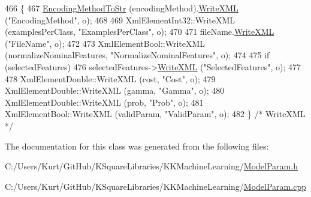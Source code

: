 \begin{DoxyCode}
466 \{
467   \hyperlink{class_k_k_m_l_l_1_1_model_param_a9a8e3761bbc46b241b32c1f19c5f4ee3}{EncodingMethodToStr} (encodingMethod).\hyperlink{class_k_k_b_1_1_k_k_str_a7de8ac49f70cdcdf2cc31786d23b8a62}{WriteXML} (\textcolor{stringliteral}{"EncodingMethod"}, o);
468 
469   XmlElementInt32::WriteXML (examplesPerClass, \textcolor{stringliteral}{"ExamplesPerClass"}, o);
470 
471   fileName.\hyperlink{class_k_k_b_1_1_k_k_str_a7de8ac49f70cdcdf2cc31786d23b8a62}{WriteXML} (\textcolor{stringliteral}{"FileName"}, o);
472 
473   XmlElementBool::WriteXML (normalizeNominalFeatures, \textcolor{stringliteral}{"NormalizeNominalFeatures"}, o);
474 
475   \textcolor{keywordflow}{if}  (selectedFeatures)
476     selectedFeatures->\hyperlink{class_k_k_m_l_l_1_1_feature_num_list_a8119e4ff5c20ad2793df8766c9cb84ea}{WriteXML} (\textcolor{stringliteral}{"SelectedFeatures"}, o);
477 
478   XmlElementDouble::WriteXML (cost,       \textcolor{stringliteral}{"Cost"},       o);
479   XmlElementDouble::WriteXML (gamma,      \textcolor{stringliteral}{"Gamma"},      o);
480   XmlElementDouble::WriteXML (prob,       \textcolor{stringliteral}{"Prob"},       o);
481   XmlElementBool::WriteXML   (validParam, \textcolor{stringliteral}{"ValidParam"}, o);
482 \}  \textcolor{comment}{/* WriteXML */}
\end{DoxyCode}


The documentation for this class was generated from the following files\+:\begin{DoxyCompactItemize}
\item 
C\+:/\+Users/\+Kurt/\+Git\+Hub/\+K\+Square\+Libraries/\+K\+K\+Machine\+Learning/\hyperlink{_model_param_8h}{Model\+Param.\+h}\item 
C\+:/\+Users/\+Kurt/\+Git\+Hub/\+K\+Square\+Libraries/\+K\+K\+Machine\+Learning/\hyperlink{_model_param_8cpp}{Model\+Param.\+cpp}\end{DoxyCompactItemize}
